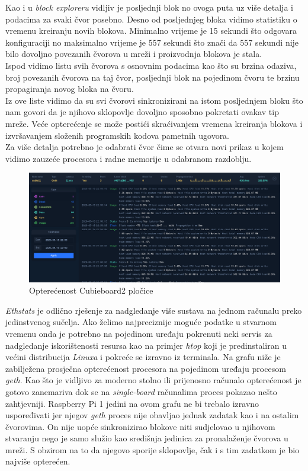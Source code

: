 \documentclass[times, utf8, zavrsni, numeric]{fer}
\begin{document}
Kao i u \emph{block exploreru} vidljiv je posljednji blok no ovoga puta uz više detalja i podacima za svaki čvor posebno.
Desno od posljednjeg bloka vidimo statistiku o vremenu kreiranju novih blokova. Minimalno vrijeme je 15 sekundi što odgovara konfiguraciji
no maksimalno vrijeme je 557 sekundi što znači da 557 sekundi nije bilo dovoljno povezanih čvorova u mreži i proizvodnja blokova je stala. \\
Ispod vidimo listu svih čvorova s osnovnim podacima kao što su brzina odaziva, broj povezanih čvorova na taj čvor, posljednji blok na pojedinom
čvoru te brzinu propagiranja novog bloka na čvoru. \\
Iz ove liste vidimo da su svi čvorovi sinkronizirani na istom posljednjem bloku što nam govori da je njihovo sklopovlje dovoljno sposobno
pokretati ovakav tip mreže. Veće opterećenje se može postići skraćivanjem vremena kreiranja blokova i izvršavanjem složenih programskih
kodova pametnih ugovora. \\
Za više detalja potrebno je odabrati čvor čime se otvara novi prikaz u kojem vidimo zauzeće procesora i radne memorije u odabranom
 razdoblju.
\pagebreak

\begin{figure}[ht]
  \includegraphics[width=\textwidth]{ethstatsCubie.png}
  \caption{Opterećenost Cubieboard2 pločice}
  \centering
\end{figure}

\emph{Ethstats} je odlično rješenje za nadgledanje više sustava na jednom računalu preko jedinstvenog sučelja. Ako želimo najpreciznije 
moguće podatke u stvarnom vremenu onda je potrebno na pojedinom uređaju pokrenuti neki servis za nadgledanje iskorištenosti resursa kao
na primjer \emph{htop} koji je predinstaliran u većini distribucija \emph{Linuxa} i pokreće se izravno iz terminala. Na grafu niže
je zabilježena prosječna opterećenost procesora na pojedinom uređaju procesom \emph{geth}. Kao što je vidljivo za moderno stolno ili prijenosno računalo opterećenost
je gotovo zanemariva dok se na \emph{single-board} računalima proces pokazao nešto zahtjevniji. Raspberry Pi 1 jedini na ovom grafu ne bi trebalo izravno uspoređivati
jer njegov \emph{geth} proces nije obavljao jednak zadatak kao i na ostalim čvorovima. On nije uopće sinkronizirao blokove niti sudjelovao u njihovom stvaranju nego
je samo služio kao središnja jedinica za pronalaženje čvorova u mreži. S obzirom na to da njegovo sporije sklopovlje, čak i s tim zadatkom je bio najviše opterećen.
\end{document}
